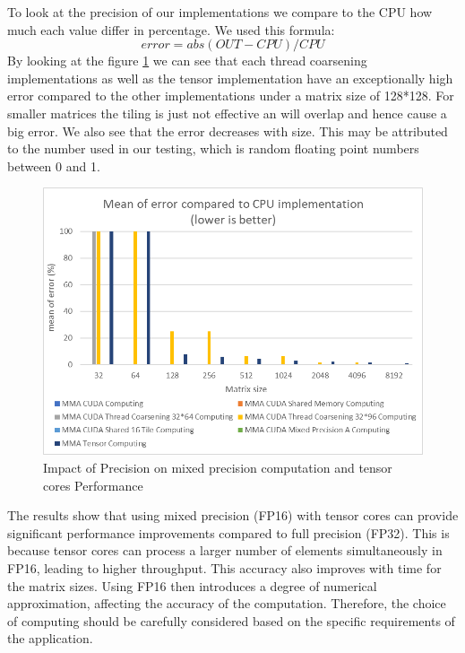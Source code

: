 \documentclass[conference]{IEEEtran}
\begin{document}
  To look at the precision of our implementations we compare to the CPU how much each value differ in percentage. We used this formula:
  \[error = abs(OUT - CPU) / CPU \]
  By looking at the figure \ref{fig:precision-impact} we can see that each thread coarsening implementations as well as the tensor implementation
  have an exceptionally high error compared to the other implementations under a matrix size of 128*128.
  For smaller matrices the tiling is just not effective an will overlap and hence cause a big error. We also see that the error decreases with size.
  This may be attributed to the number used in our testing, which is random floating point numbers between 0 and 1. 
  \begin{figure}[htbp]
    \centering
    \includegraphics[scale=0.6]{figures/Mean of error compared to CPU 2.png}
    \caption{Impact of Precision on mixed precision computation and tensor cores Performance}
    \label{fig:precision-impact}
  \end{figure}
  
  The results show that using mixed precision (FP16) with tensor cores can provide significant performance improvements compared to full precision (FP32).
  This is because tensor cores can process a larger number of elements simultaneously in FP16,
  leading to higher throughput. This accuracy also improves with time for the matrix sizes.
  Using FP16 then introduces a degree of numerical approximation, affecting the accuracy of the computation.
  Therefore, the choice of computing should be carefully considered based on the specific
  requirements of the application. 
  
  
\end{document}
